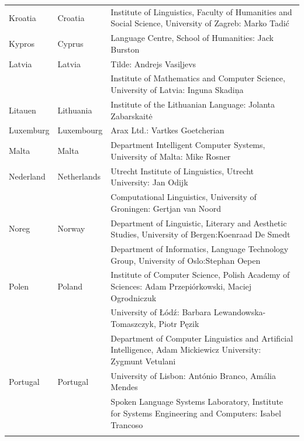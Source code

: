 \begin{longtable}{llp{114mm}}
  Kroatia & \textcolor{grey1}{Croatia} & Institute of Linguistics, Faculty of Humanities and Social Science, University of Zagreb: Marko Tadić \\ \addlinespace
  Kypros & \textcolor{grey1}{Cyprus} & Language Centre, School of
  Humanities: Jack Burston \\ \addlinespace
  Latvia & \textcolor{grey1}{Latvia} & Tilde: Andrejs Vasiļjevs\\ \addlinespace 
  & & Institute of Mathematics and Computer Science, University of Latvia: Inguna Skadiņa\\ \addlinespace
  Litauen & \textcolor{grey1}{Lithuania} & Institute of the Lithuanian Language: Jolanta Zabarskaitė\\ \addlinespace
  Luxemburg & \textcolor{grey1}{Luxembourg} & Arax Ltd.: Vartkes Goetcherian\\ \addlinespace
  Malta & \textcolor{grey1}{Malta} & Department Intelligent Computer Systems, University of Malta: Mike Rosner\\ \addlinespace
  Nederland & \textcolor{grey1}{Netherlands} & Utrecht Institute of Linguistics, Utrecht University: Jan Odijk\\ \addlinespace 
  & & Computational Linguistics, University of Groningen: Gertjan van Noord\\ \addlinespace 
  Noreg & \textcolor{grey1}{Norway} & Department of Linguistic, Literary and Aesthetic Studies, University of Bergen:\newline Koenraad De Smedt\\ \addlinespace 
  & & Department of Informatics, Language Technology Group, University of Oslo:\newline Stephan Oepen \\ \addlinespace
  Polen & \textcolor{grey1}{Poland} & Institute of Computer Science, Polish Academy of Sciences: Adam Przepiórkowski, \newline Maciej Ogrodniczuk \\ \addlinespace
  & & University of Łódź: Barbara Lewandowska-Tomaszczyk, Piotr Pęzik\\ \addlinespace 
  & & Department of Computer Linguistics and Artificial Intelligence, Adam Mickiewicz University: Zygmunt Vetulani\\ \addlinespace  
  Portugal & \textcolor{grey1}{Portugal} & University of Lisbon: António Branco, Amália Mendes \\ \addlinespace
  & & Spoken Language Systems Laboratory, Institute for Systems Engineering and Computers: Isabel Trancoso \\ \addlinespace

\end{longtable}
